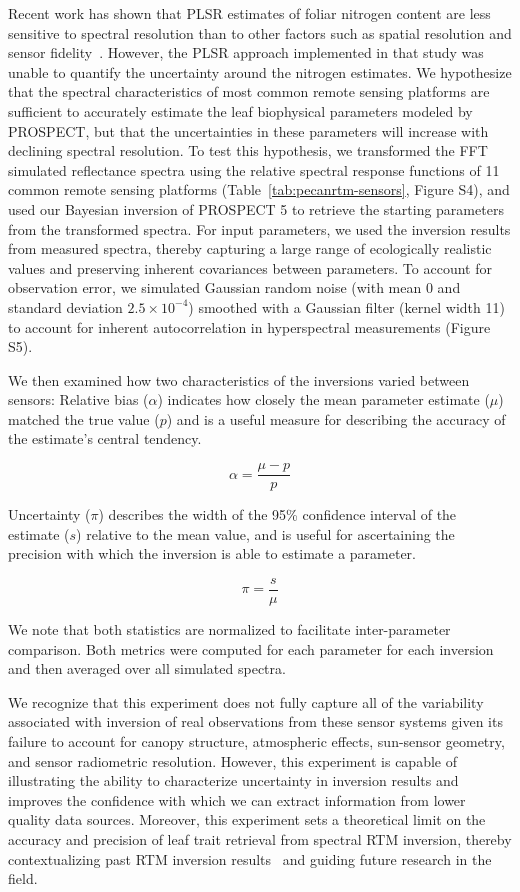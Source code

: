 Recent work has shown that PLSR estimates of foliar nitrogen content are less sensitive to spectral resolution than to other factors such as spatial resolution and sensor fidelity~\cite{lepine_2016_examining}.
However, the PLSR approach implemented in that study was unable to quantify the uncertainty around the nitrogen estimates.
We hypothesize that the spectral characteristics of most common remote sensing platforms are sufficient to accurately estimate the leaf biophysical parameters modeled by PROSPECT, but that the uncertainties in these parameters will increase with declining spectral resolution.
To test this hypothesis, we transformed the FFT simulated reflectance spectra using the relative spectral response functions of 11 common remote sensing platforms (Table~\ref{tab:pecanrtm-sensors}, Figure S4), %
and used our Bayesian inversion of PROSPECT 5 to retrieve the starting parameters from the transformed spectra.
For input parameters, we used the inversion results from measured spectra, thereby capturing a large range of ecologically realistic values and preserving inherent covariances between parameters.
To account for observation error, we simulated Gaussian random noise (with mean 0 and standard deviation $2.5 \times 10^{-4}$) smoothed with a Gaussian filter (kernel width 11) to account for inherent autocorrelation in hyperspectral measurements (Figure S5). %

We then examined how two characteristics of the inversions varied between sensors:
Relative bias ($\alpha$) indicates how closely the mean parameter estimate ($\mu$) matched the true value ($p$) and is a useful measure for describing the accuracy of the estimate’s central tendency.

\[ \alpha = \frac{\mu - p}{p} \]

Uncertainty ($\pi$) describes the width of the 95\% confidence interval of the estimate ($s$) relative to the mean value,
and is useful for ascertaining the precision with which the inversion is able to estimate a parameter.

\[ \pi = \frac{s}{\mu} \]

We note that both statistics are normalized to facilitate inter-parameter comparison.
Both metrics were computed for each parameter for each inversion and then averaged over all simulated spectra.

We recognize that this experiment does not fully capture all of the variability associated with inversion of real observations from these sensor systems given its failure to account for canopy structure, atmospheric effects, sun-sensor geometry, and sensor radiometric resolution.
However, this experiment is capable of illustrating the ability to characterize uncertainty in inversion results and improves the confidence with which we can extract information from lower quality data sources.
Moreover, this experiment sets a theoretical limit on the accuracy and precision of leaf trait retrieval from spectral RTM inversion, thereby contextualizing past RTM inversion results~\cite{zhang_2005_estimating,zhang_2006_characterization,zhang_2009_satellite,zhang_2012_estimating} and guiding future research in the field.

